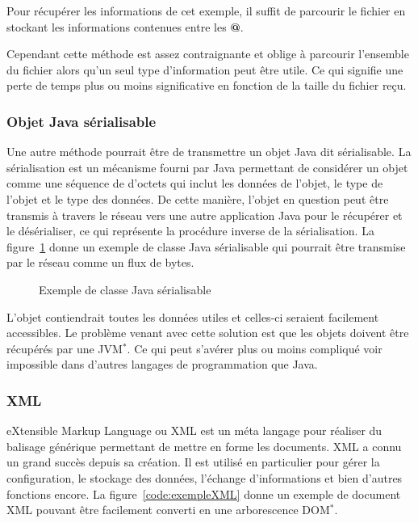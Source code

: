 Pour r\'ecup\'erer les informations de cet exemple, il suffit de parcourir le fichier en stockant les informations contenues entre les \textbf{@}.

Cependant cette m\'ethode est assez contraignante et oblige \`a parcourir l'ensemble du fichier alors qu'un seul type d'information peut \^etre utile.
Ce qui signifie une perte de temps plus ou moins significative en fonction de la taille du fichier re\c{c}u.

\subsubsection{Objet Java s\'erialisable}

Une autre m\'ethode pourrait \^etre de transmettre un objet Java dit s\'erialisable.
La s\'erialisation est un m\'ecanisme fourni par Java permettant de consid\'erer un objet comme une s\'equence de d'octets qui inclut les donn\'ees de l'objet, le type de l'objet et le type des donn\'ees.
De cette mani\`ere, l'objet en question peut \^etre transmis \`a travers le r\'eseau vers une autre application Java pour le r\'ecup\'erer et le d\'es\'erialiser, ce qui repr\'esente la proc\'edure inverse de la s\'erialisation.
La figure~\ref{code:exempleJava} donne un exemple de classe Java s\'erialisable qui pourrait \^etre transmise par le r\'eseau comme un flux de bytes.

\vspace{0.20cm}

\begin{figure}[!ht]
	
	\caption{Exemple de classe Java s\'erialisable}
	\label{code:exempleJava}

\end{figure}

L'objet contiendrait toutes les donn\'ees utiles et celles-ci seraient facilement accessibles.
Le probl\`eme venant avec cette solution est que les objets doivent \^etre r\'ecup\'er\'es par une JVM$^*$.
Ce qui peut s'av\'erer plus ou moins compliqu\'e voir impossible dans d'autres langages de programmation que Java.

\subsubsection{XML}

eXtensible Markup Language ou XML est un m\'eta langage pour r\'ealiser du balisage g\'en\'erique permettant de mettre en forme les documents. XML a connu un grand succ\`es depuis sa cr\'eation.
Il est utilis\'e en particulier pour g\'erer la configuration, le stockage des donn\'ees, l'\'echange d'informations et bien d'autres fonctions encore.
La figure~\ref{code:exempleXML} donne un exemple de document XML pouvant \^etre facilement converti en une arborescence DOM$^*$.

